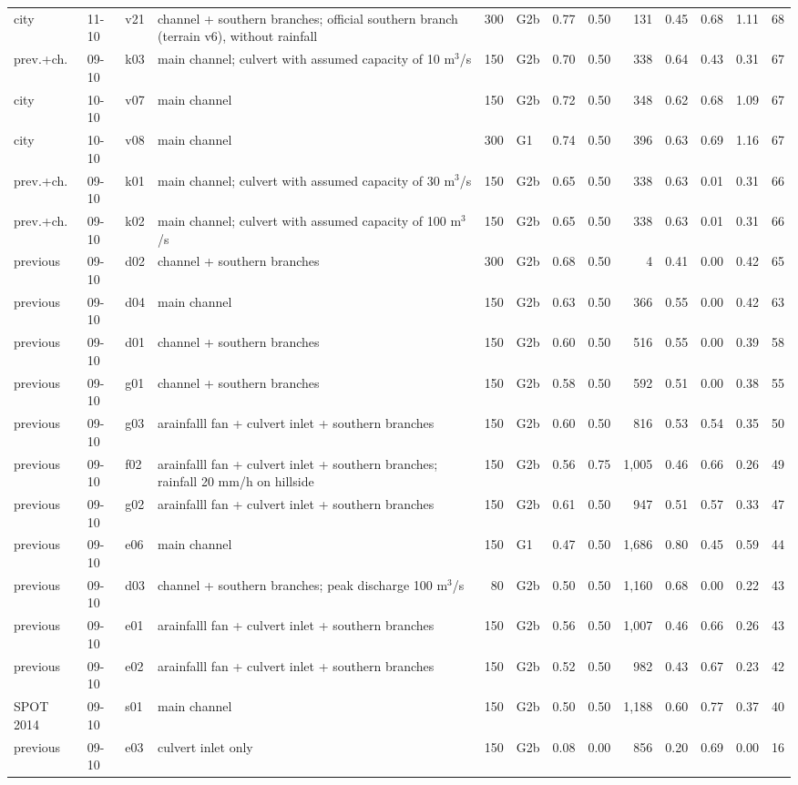 {\begin{longtable}{lll>{\raggedright\arraybackslash}p{3.3cm}rlrrrrrrr}
city & 11-10 & v21 & channel + southern branches; official southern branch (terrain v6), without rainfall & 300 & G2b & 0.77 & 0.50 & 131 & 0.45 & 0.68 & 1.11 & 68\\
prev.+ch. & 09-10 & k03 & main channel; culvert with assumed capacity of 10 m$^3$/s & 150 & G2b & 0.70 & 0.50 & 338 & 0.64 & 0.43 & 0.31 & 67\\
city & 10-10 & v07 & main channel & 150 & G2b & 0.72 & 0.50 & 348 & 0.62 & 0.68 & 1.09 & 67\\
city & 10-10 & v08 & main channel & 300 & G1 & 0.74 & 0.50 & 396 & 0.63 & 0.69 & 1.16 & 67\\
prev.+ch. & 09-10 & k01 & main channel; culvert with assumed capacity of 30 m$^3$/s & 150 & G2b & 0.65 & 0.50 & 338 & 0.63 & 0.01 & 0.31 & 66\\
prev.+ch. & 09-10 & k02 & main channel; culvert with assumed capacity of 100 m$^3$/s & 150 & G2b & 0.65 & 0.50 & 338 & 0.63 & 0.01 & 0.31 & 66\\
previous & 09-10 & d02 & channel + southern branches & 300 & G2b & 0.68 & 0.50 & 4 & 0.41 & 0.00 & 0.42 & 65\\
previous & 09-10 & d04 & main channel & 150 & G2b & 0.63 & 0.50 & 366 & 0.55 & 0.00 & 0.42 & 63\\
previous & 09-10 & d01 & channel + southern branches & 150 & G2b & 0.60 & 0.50 & 516 & 0.55 & 0.00 & 0.39 & 58\\
previous & 09-10 & g01 & channel + southern branches & 150 & G2b & 0.58 & 0.50 & 592 & 0.51 & 0.00 & 0.38 & 55\\
previous & 09-10 & g03 & arainfalll fan + culvert inlet + southern branches & 150 & G2b & 0.60 & 0.50 & 816 & 0.53 & 0.54 & 0.35 & 50\\
previous & 09-10 & f02 & arainfalll fan + culvert inlet + southern branches; rainfall 20 mm/h on hillside & 150 & G2b & 0.56 & 0.75 & 1,005 & 0.46 & 0.66 & 0.26 & 49\\
previous & 09-10 & g02 & arainfalll fan + culvert inlet + southern branches & 150 & G2b & 0.61 & 0.50 & 947 & 0.51 & 0.57 & 0.33 & 47\\
previous & 09-10 & e06 & main channel & 150 & G1 & 0.47 & 0.50 & 1,686 & 0.80 & 0.45 & 0.59 & 44\\
previous & 09-10 & d03 & channel + southern branches; peak discharge 100 m$^3$/s & 80 & G2b & 0.50 & 0.50 & 1,160 & 0.68 & 0.00 & 0.22 & 43\\
previous & 09-10 & e01 & arainfalll fan + culvert inlet + southern branches & 150 & G2b & 0.56 & 0.50 & 1,007 & 0.46 & 0.66 & 0.26 & 43\\
previous & 09-10 & e02 & arainfalll fan + culvert inlet + southern branches & 150 & G2b & 0.52 & 0.50 & 982 & 0.43 & 0.67 & 0.23 & 42\\
SPOT 2014 & 09-10 & s01 & main channel & 150 & G2b & 0.50 & 0.50 & 1,188 & 0.60 & 0.77 & 0.37 & 40\\
previous & 09-10 & e03 & culvert inlet only & 150 & G2b & 0.08 & 0.00 & 856 & 0.20 & 0.69 & 0.00 & 16\\
\bottomrule\end{longtable}}
